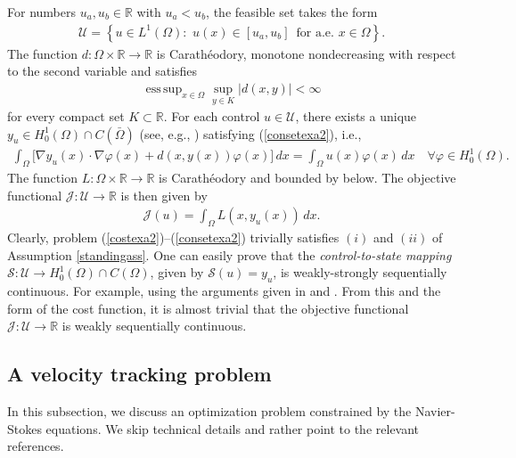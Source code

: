\documentclass[hidelinks,onefignum,onetabnum]{siamart220329}
\DeclareMathOperator*{\esssup}{ess\,sup}
\begin{document}
For numbers $u_a,u_b\in\mathbb R$ with $u_a<u_{b}$,  the feasible set takes the form
\begin{align*}
	\mathcal U=\left\lbrace u \in L^1(\Omega):\,\, u(x)\in [u_a,u_b]\,\,\, \text{for a.e. $x\in\Omega$} \right\rbrace.
\end{align*}
The function $d:\Omega\times\mathbb R\to\mathbb R$ is Carath\' eodory, monotone nondecreasing with respect to the second variable and satisfies
\begin{align*}  \esssup_{x\in\Omega}\sup_{y\in K}|d(x,y)|<\infty
\end{align*}
for every compact set $K\subset \mathbb R$.
 For each control $u\in\mathcal U$, there exists a unique $y_u\in H_{0}^1(\Omega)\cap C(\bar\Omega)$ (see, e.g., 
 \cite[Theorem 2.7]{Casaselliptic}) satisfying (\ref{consetexa2}), i.e., 
\begin{align*}
	\int_{\Omega} \Big[\nabla y_{u}(x)\cdot\nabla \varphi(x)+d(x,y(x))\varphi(x)\Big]\,dx=\int_{\Omega}u(x) \varphi(x)\, dx\quad\forall \varphi\in H_0^1(\Omega).
\end{align*}
 The function $L:\Omega\times\mathbb R\to\mathbb R$ is Carath\'eodory and bounded by below.
The objective functional $\mathcal J:\mathcal U\to\mathbb R$ is then given by
\begin{align*}
	\mathcal J(u)=\int_{\Omega}L(x,y_{u}(x))\, dx.
\end{align*}
Clearly, problem (\ref{costexa2})--(\ref{consetexa2})  trivially satisfies $(i)$ and $(ii)$ of Assumption \ref{standingass}. One can easily prove that   the \textit{control-to-state mapping}  $\mathcal S:\mathcal U\to H_0^1(\Omega)\cap C(\Omega)$, given by $\mathcal S(u)=y_u$, is weakly-strongly sequentially continuous. For example,  using the arguments given in \cite[Lemma 2.5]{Elliptic} and  \cite[Proposition 2.12]{Elliptic}. From this and the form of the cost function, it is almost trivial that the objective functional $\mathcal J:\mathcal U\to\mathbb R$ is weakly sequentially continuous.



\subsection{A velocity tracking problem}
In this subsection, we discuss an optimization problem constrained by the Navier-Stokes equations. We skip technical details and rather point to the relevant references.
\end{document}
